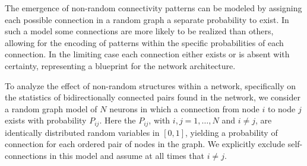 







The emergence of non-random connectivity patterns can be modeled by
assigning each possible connection in a random graph a separate
probability to exist.
%
In such a model some connections are more likely to be realized than
others, allowing for the encoding of patterns within the specific
probabilities of each connection.
%
In the limiting case each connection either exists or is absent with
certainty, representing a blueprint for the network architecture.
%

%
To analyze the effect of non-random structures within a network,
specifically on the statistics of bidirectionally connected pairs
found in the network, we consider a random graph model of $N$ neurons
in which a connection from node $i$ to node $j$ exists with
probability $P_{ij}$.
%
Here the $P_{ij}$, with $i,j = 1,\dots,N$ and $i \neq j$, are identically
distributed random variables in $[0,1]$, yielding a probability of
connection for each ordered pair of nodes in the graph. We explicitly exclude self-connections in this model and assume at all times that $i \neq j$.%
%

